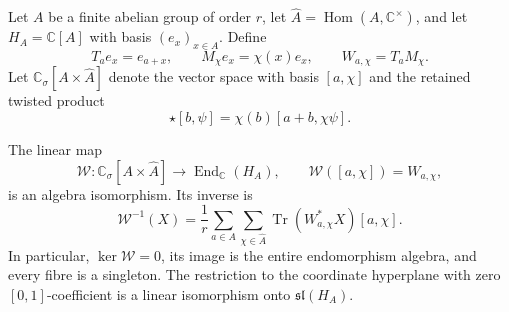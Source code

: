 Let $A$ be a finite abelian group of order $r$, let
$\widehat A=\operatorname{Hom}(A,\mathbb C^\times)$, and let
$H_A=\mathbb C[A]$ with basis $(e_x)_{x\in A}$.  Define
\begin{equation}
 T_ae_x=e_{a+x},
 \qquad
 M_\chi e_x=\chi(x)e_x,
 \qquad
 W_{a,\chi}=T_aM_\chi.
 \label{eq:finite-weyl-coordinates}
\end{equation}
Let $\mathbb C_\sigma[A\times\widehat A]$ denote the vector space with basis
$[a,\chi]$ and the retained twisted product
\begin{equation}
 [a,\chi]\star[b,\psi]=\chi(b)[a+b,\chi\psi].
 \label{eq:finite-weyl-twisted-product}
\end{equation}

\begin{proposition}
\label{prop:finite-weyl-coordinate-isomorphism}
The linear map
\begin{equation}
 \mathcal W:\mathbb C_\sigma[A\times\widehat A]\longrightarrow
 \operatorname{End}_{\mathbb C}(H_A),
 \qquad
 \mathcal W([a,\chi])=W_{a,\chi},
 \label{eq:finite-weyl-linear-map}
\end{equation}
is an algebra isomorphism.  Its inverse is
\begin{equation}
 \mathcal W^{-1}(X)=\frac1r
 \sum_{a\in A}\sum_{\chi\in\widehat A}
 \operatorname{Tr}(W_{a,\chi}^*X)[a,\chi].
 \label{eq:finite-weyl-inverse}
\end{equation}
In particular, $\ker\mathcal W=0$, its image is the entire endomorphism algebra, and every
fibre is a singleton.  The restriction to the coordinate hyperplane with zero
$[0,1]$-coefficient is a linear isomorphism onto
$\mathfrak{sl}(H_A)$.
\end{proposition}

